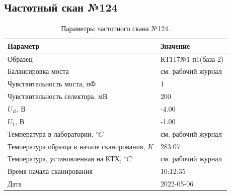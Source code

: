 \subsection{Частотный скан №124}
\begin{table}[!ht]
    \centering
    \caption{Параметры частотного скана №124.}
    \begin{tabular}{|l|l|}
        \hline
        Параметр                                       & Значение                  \\ \hline
        Образец                                        & КТ117№1 п1(база 2)        \\ \hline
        Балансировка моста                             & см. рабочий журнал        \\ \hline
        Чувствительность моста, пФ                     & 1                         \\ \hline
        Чувствительность селектора, мВ                 & 200                       \\ \hline
        $U_R$, В                                       & -4.00                     \\ \hline
        $U_1$, В                                       & -1.00                     \\ \hline
        Температура в лаборатории, $^\circ C$          & см. рабочий журнал        \\ \hline
        Температура образца в начале сканирования, $K$ & 283.07                    \\ \hline
        Температура, установленная на КТХ, $^\circ C$  & см. рабочий журнал        \\ \hline
        Время начала сканирования                      & 10:12:35                  \\ \hline
        Дата                                           & 2022-05-06                \\ \hline
    \end{tabular}
    \label{table:frequency_scan_124}
\end{table}


